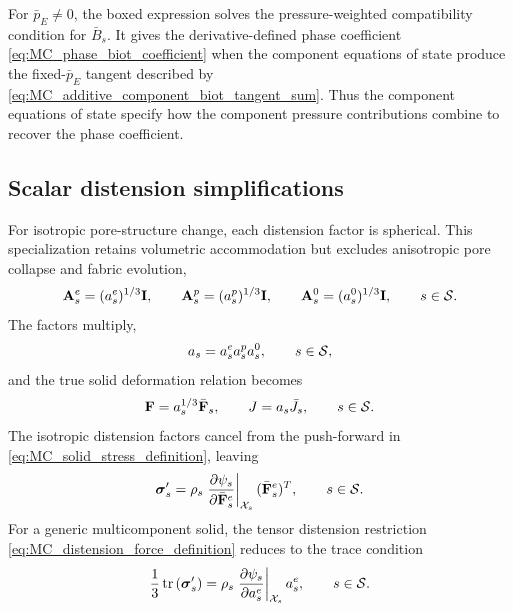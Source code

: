 %
For \(\bar p_E\ne0\), the boxed expression solves the pressure-weighted
compatibility condition for \(\bar B_s\).  It gives the derivative-defined
phase coefficient \eqref{eq:MC_phase_biot_coefficient} when the component
equations of state produce the fixed-\(\bar p_E\) tangent described by
\eqref{eq:MC_additive_component_biot_tangent_sum}.  Thus the component equations
of state specify how the component pressure contributions combine to recover
the phase coefficient.

\subsection{Scalar distension simplifications}
\label{sec:MC_scalar_distension_simplifications}

For isotropic pore-structure change, each distension factor is spherical.  This
specialization retains volumetric accommodation but excludes anisotropic pore
collapse and fabric evolution,
%
\begin{equation}
	\mathbf{A}_s^e=(a_s^e)^{1/3}\mathbf{I},
	\qquad
	\mathbf{A}_s^p=(a_s^p)^{1/3}\mathbf{I},
	\qquad
	\mathbf{A}_s^0=(a_s^0)^{1/3}\mathbf{I},
	\qquad
	s\in\mathcal{S} .
	\label{eq:MC_scalar_distension_factors}
\end{equation}
%
The factors multiply,
%
\begin{equation}
	a_s=a_s^e a_s^p a_s^0,
	\qquad
	s\in\mathcal{S} ,
	\label{eq:MC_scalar_distension_product}
\end{equation}
%
and the true solid deformation relation becomes
%
\begin{equation}
	\mathbf{F}=a_s^{1/3}\bar{\mathbf{F}}_s,
	\qquad
	J=a_s\bar J_s,
	\qquad
	s\in\mathcal{S} .
	\label{eq:MC_scalar_distension_deformation}
\end{equation}
%
The isotropic distension factors cancel from the push-forward in
\eqref{eq:MC_solid_stress_definition}, leaving
%
\begin{equation}
	\boldsymbol{\sigma}_s'
	=
	\rho_s
	\left.
	\frac{\partial \psi_s}{\partial \bar{\mathbf{F}}_s^e}
	\right\vert_{\mathcal{X}_s}
	(\bar{\mathbf{F}}_s^e)^T,
	\qquad
	s\in\mathcal{S} .
	\label{eq:MC_scalar_distension_solid_stress}
\end{equation}
%
For a generic multicomponent solid, the tensor distension restriction
\eqref{eq:MC_distension_force_definition} reduces to the trace condition
%
\begin{equation}
	\frac{1}{3}\operatorname{tr}\left(
	\boldsymbol{\sigma}_s'
	\right)
	=
	\rho_s
	\left.
	\frac{\partial \psi_s}{\partial a_s^e}
	\right\vert_{\mathcal{X}_s}
	a_s^e,
	\qquad
	s\in\mathcal{S} .
	\label{eq:MC_scalar_distension_stress_restriction}
\end{equation}
